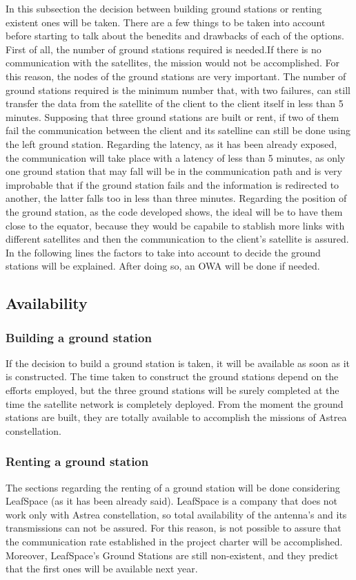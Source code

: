 In this subsection the decision between building ground stations or renting existent ones will be taken. There are a few things to be taken into account before starting to talk about the benedits and drawbacks of each of the options. First of all, the number of ground stations required is needed.If there is no communication with the satellites, the mission would not be accomplished. For this reason, the nodes of the ground stations are very important. The number of ground stations required is the minimum number that, with two failures, can still transfer the data from the satellite of the client to the client itself in less than 5 minutes. Supposing that three ground stations are built or rent, if two of them fail the communication between the client and its satelline can still be done using the left ground station. Regarding the latency, as it has been already exposed, the communication will take place with a latency of less than 5 minutes, as only one ground station that may fall will be in the communication path and is very improbable that if the ground station fails and the information is redirected to another, the latter falls too in less than three minutes. Regarding the position of the ground station, as the code developed shows, the ideal will be to have them close to the equator, because they would be capabile to stablish more links with different satellites and then the communication to the client's satellite is assured. In the following lines the factors to take into account to decide the ground stations will be explained. After doing so, an OWA will be done if needed.
\subsection{Availability}
\subsubsection{Building a ground station}
If the decision to build a ground station is taken, it will be available as soon as it is constructed. The time taken to construct the ground stations depend on the efforts employed, but the three ground stations will be surely completed at the time the satellite network is completely deployed. From the moment the ground stations are built, they are totally available to accomplish the missions of Astrea constellation.
\subsubsection{Renting a ground station}
The sections regarding the renting of a ground station will be done considering LeafSpace (as it has been already said). LeafSpace is a company that does not work only with Astrea constellation, so total availability of the antenna's and its transmissions can not be assured. For this reason, is not possible to assure that the communication rate established in the project charter will be accomplished. Moreover, LeafSpace's Ground Stations are still non-existent, and they predict that the first ones will be available next year.
